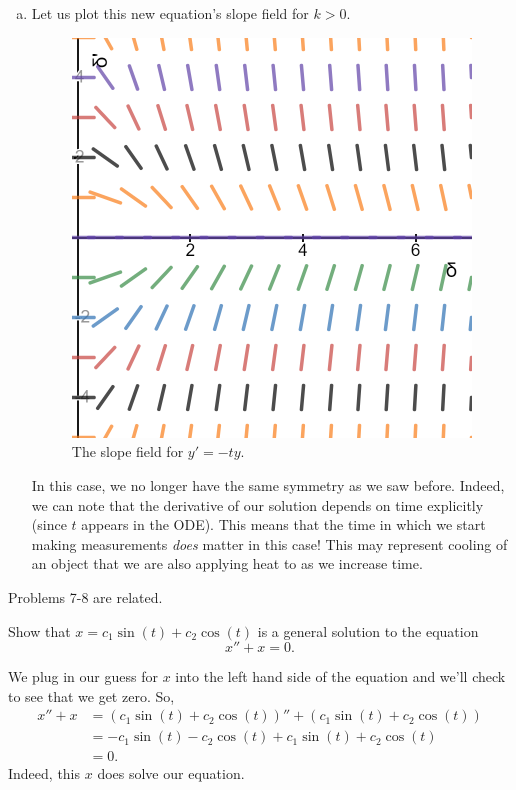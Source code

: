\documentclass[12pt]{article} %
\begin{document}
\begin{solution}
\begin{enumerate}[(a)]
    \item Let us plot this new equation's slope field for $k>0$.
        \begin{figure}[H]
            \centering
            \includegraphics[width=.4\textwidth]{new_slope_field.png}
            \caption{The slope field for $y'=-ty$.}
        \end{figure}
    In this case, we no longer have the same symmetry as we saw before.  Indeed, we can note that the derivative of our solution depends on time explicitly (since $t$ appears in the ODE). This means that the time in which we start making measurements \emph{does} matter in this case! This may represent cooling of an object that we are also applying heat to as we increase time.
\end{enumerate}
\end{solution}

\newpage

\begin{center}
    Problems 7-8 are related.
\end{center}
\begin{problem}
    Show that $x=c_1\sin(t)+c_2\cos(t)$ is a general solution to the equation
    \[
        x''+x=0.
    \]
\end{problem}
\begin{solution}
We plug in our guess for $x$ into the left hand side of the equation and we'll check to see that we get zero.  So,
\begin{align*}
    x''+x&=(c_1\sin(t)+c_2\cos(t))''+(c_1\sin(t)+c_2\cos(t))\\
    &= -c_1\sin(t)-c_2\cos(t)+c_1\sin(t)+c_2\cos(t)\\
    &=0.
\end{align*}
Indeed, this $x$ does solve our equation.
\end{solution}

\newpage
\end{document}
